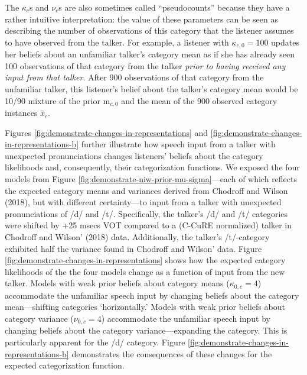 \documentclass[
  11pt,
  english,
  man,floatsintext]{apa6}
\begin{document}
The \(\kappa_{c}\)s and \(\nu_{c}\)s are also sometimes called ``pseudocounts'' because they have a rather intuitive interpretation: the value of these parameters can be seen as describing the number of observations of this category that the listener assumes to have observed from the talker. For example, a listener with \(\kappa_{c,0} = 100\) updates her beliefs about an unfamiliar talker's category mean as if she has already seen 100 observations of that category from the talker \emph{prior to having received any input from that talker}. After 900 observations of that category from the unfamiliar talker, this listener's belief about the talker's category mean would be 10/90 mixture of the prior \(\mathrm{m}_{c,0}\) and the mean of the 900 observed category instances \(\bar{x}_c\).

Figures \ref{fig:demonstrate-changes-in-representations} and \ref{fig:demonstrate-changes-in-representations-b} further illustrate how speech input from a talker with unexpected pronunciations changes listeners' beliefs about the category likelihoods and, consequently, their categorization functions. We exposed the four models from Figure \ref{fig:demonstrate-niw-prior-mu-sigma}---each of which reflects the expected category means and variances derived from Chodroff and Wilson (2018), but with different certainty---to input from a talker with unexpected pronunciations of /d/ and /t/. Specifically, the talker's /d/ and /t/ categories were shifted by +25 msecs VOT compared to a (C-CuRE normalized) talker in Chodroff and Wilson' (2018) data. Additionally, the talker's /t/-category exhibited half the variance found in Chodroff and Wilson' data. Figure \ref{fig:demonstrate-changes-in-representations} shows how the expected category likelihoods of the the four models change as a function of input from the new talker. Models with weak prior beliefs about category means (\(\kappa_{0,c}=4\)) accommodate the unfamiliar speech input by changing beliefs about the category mean---shifting categories `horizontally.' Models with weak prior beliefs about category variance (\(\nu_{0,c}=4\)) accommodate the unfamiliar speech input by changing beliefs about the category variance---expanding the category. This is particularly apparent for the /d/ category. Figure \ref{fig:demonstrate-changes-in-representations-b} demonstrates the consequences of these changes for the expected categorization function.
\end{document}
